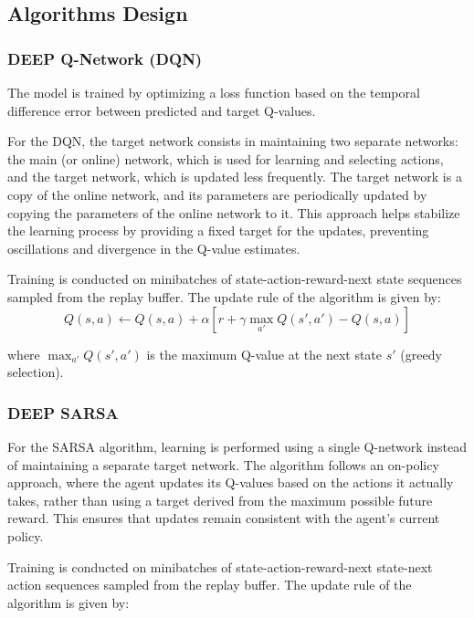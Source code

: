 \documentclass[../CSC_52081_EP.tex]{subfiles}
\begin{document}
\subsection{Algorithms Design}

\hspace{1cm}

\subsubsection{DEEP Q-Network (DQN)}
The model is trained by optimizing a loss function based on the temporal difference error between predicted and target Q-values.

For the DQN, the target network consists in maintaining two separate networks: the main (or online) network, which is used for learning and selecting actions, and the target network, which is updated less frequently. The target network is a copy of the online network, and its parameters are periodically updated by copying the parameters of the online network to it. This approach helps stabilize the learning process by providing a fixed target for the updates, preventing oscillations and divergence in the Q-value estimates.

Training is conducted on minibatches of state-action-reward-next state sequences sampled from the replay buffer. The update rule of the algorithm is given by:
    \begin{equation}
        Q(s, a) \leftarrow Q(s, a) + \alpha \left[ r + \gamma \max_{a'} Q(s', a') - Q(s, a) \right]
    \end{equation}

    where $\max_{a'} Q(s', a')$ is the maximum Q-value at the next state $s'$ (greedy selection).

\hspace{1cm}

\subsubsection{DEEP SARSA}
For the SARSA algorithm, learning is performed using a single Q-network instead of maintaining a separate target network. The algorithm follows an on-policy approach, where the agent updates its Q-values based on the actions it actually takes, rather than using a target derived from the maximum possible future reward. This ensures that updates remain consistent with the agent’s current policy.

Training is conducted on minibatches of state-action-reward-next state-next action sequences sampled from the replay buffer. The update rule of the algorithm is given by:
\end{document}
